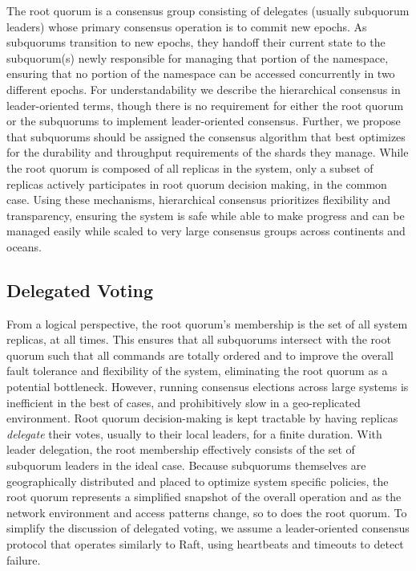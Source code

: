 \documentclass[10pt,conference]{IEEEtran}
\newcommand{\hc}{hierarchical consensus\xspace}
\newcommand{\sub}{subquorum\xspace}
\newcommand{\subs}{subquorums\xspace}
\newcommand{\roo}{root quorum\xspace}
\begin{document}
The \roo is a consensus group consisting of delegates (usually subquorum leaders) whose
primary consensus operation is to commit new epochs.
As \subs transition to new epochs, they handoff their current state to the \sub(s)
newly responsible for managing that portion of the namespace, ensuring that no portion
of the namespace can be accessed concurrently in two different epochs.
For understandability we describe the \hc in leader-oriented terms, though there is no
requirement for either the \roo or the \subs to implement leader-oriented consensus.
Further, we propose that \subs should be assigned the consensus algorithm that best
optimizes for the durability and throughput requirements of the shards they manage.
While the root quorum is composed of all replicas in the system, only a subset of
replicas actively participates in root quorum decision making, in the common case.
Using these mechanisms, \hc prioritizes flexibility and transparency, ensuring the
system is safe while able to make progress and can be managed easily while scaled to
very large consensus groups across continents and oceans.

\subsection{Delegated Voting}
\label{section:delegation}

From a logical perspective, the \roo's membership is the set of all system replicas, at
all times.
This ensures that all \subs intersect with the \roo such that all commands are totally
ordered and to improve the overall fault tolerance and flexibility of the system,
eliminating the \roo as a potential bottleneck.
However, running consensus elections across large systems is inefficient in the best of
cases, and prohibitively slow in a geo-replicated environment.
Root quorum decision-making is kept tractable by having replicas \emph{delegate} their
votes, usually to their local leaders, for a finite duration.
With leader delegation, the root membership effectively consists of the set of \sub
leaders in the ideal case.
Because \subs themselves are geographically distributed and placed to optimize system
specific policies, the \roo represents a simplified snapshot of the overall operation
and as the network environment and access patterns change, so to does the \roo.
To simplify the discussion of delegated voting, we assume a leader-oriented consensus
protocol that operates similarly to Raft, using heartbeats and timeouts to detect
failure.
\end{document}
